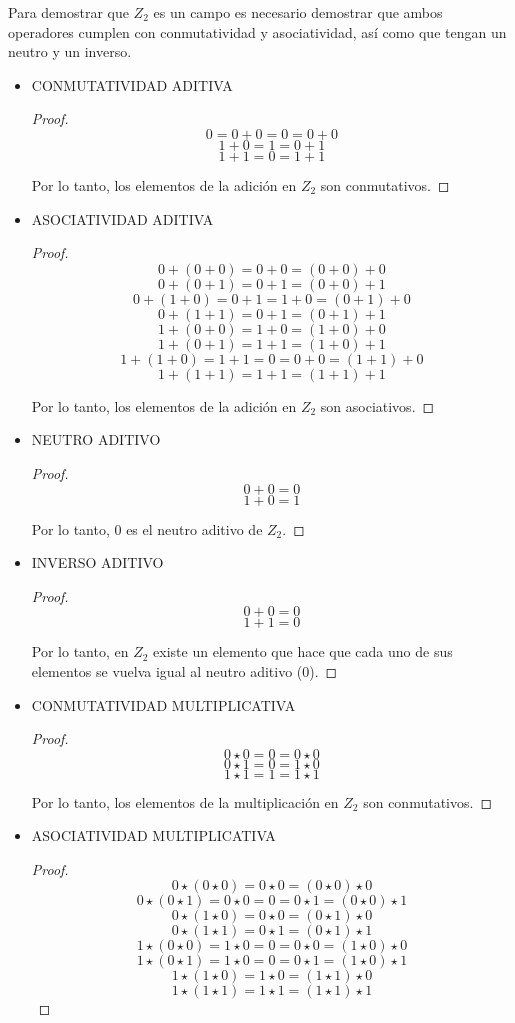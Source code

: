 \documentclass{article}
\begin{document}
Para demostrar que $Z_2$ es un campo es necesario demostrar que ambos operadores cumplen con conmutatividad y asociatividad, así como que tengan un neutro y un inverso.

\begin{itemize}
    \item CONMUTATIVIDAD ADITIVA
\begin{proof}
    $$
    0 = 0 + 0 = 0 = 0 + 0
    $$$$
    1 + 0 = 1 = 0 + 1
    $$$$
    1 + 1 = 0 = 1 + 1
    $$
    
    Por lo tanto, los elementos de la adición en $Z_2$ son conmutativos.
\end{proof}

    \item ASOCIATIVIDAD ADITIVA
\begin{proof}
$$
0+(0+0) = 0+0 = (0+0) + 0
$$$$
0+(0+1) = 0+1 = (0+0) + 1
$$$$
0+(1+0) = 0+1 = 1+0 = (0+1) + 0
$$$$
0+(1+1) = 0+1 = (0+1) + 1
$$$$
1+(0+0) = 1+0 = (1+0) + 0
$$$$
1+(0+1) = 1+1 = (1+0) + 1
$$$$
1+(1+0) = 1+1 = 0 = 0 + 0 = (1+1) + 0
$$$$
1+(1+1) = 1+1 = (1+1) + 1
$$

Por lo tanto, los elementos de la adición en $Z_2$ son asociativos.
\end{proof}

    \item NEUTRO ADITIVO
\begin{proof}
$$
0+0 = 0
$$$$
1+0 = 1
$$

Por lo tanto, $0$ es el neutro aditivo de $Z_2$.
\end{proof}

    \item INVERSO ADITIVO
\begin{proof}
$$
0 + 0 = 0
$$$$
1 + 1 = 0
$$

Por lo tanto, en $Z_2$ existe un elemento que hace que cada uno de sus elementos se vuelva igual al neutro aditivo ($0$).
\end{proof}
    \item CONMUTATIVIDAD MULTIPLICATIVA
\begin{proof}
$$
0 \star 0 = 0 = 0 \star 0
$$$$
0 \star 1 = 0 = 1 \star 0
$$$$
1 \star 1 = 1 = 1 \star 1
$$

Por lo tanto, los elementos de la multiplicación en $Z_2$ son conmutativos.
\end{proof}

\newpage
    \item ASOCIATIVIDAD MULTIPLICATIVA
\begin{proof}
$$
0 \star (0 \star 0) = 0 \star 0 = (0 \star 0) \star 0
$$$$
0 \star (0 \star 1) = 0 \star 0 = 0 = 0 \star 1 = (0 \star 0) \star 1
$$$$
0 \star (1 \star 0) = 0 \star 0 = (0 \star 1) \star 0
$$$$
0 \star (1 \star 1) = 0 \star 1 = (0 \star 1) \star 1
$$$$
1 \star (0 \star 0) = 1 \star 0 = 0 = 0 \star 0 = (1 \star 0) \star 0
$$$$
1 \star (0 \star 1) = 1 \star 0 = 0 = 0 \star 1 = (1 \star 0) \star 1
$$$$
1 \star (1 \star 0) = 1 \star 0 = (1 \star 1) \star 0
$$$$
1 \star (1 \star 1) = 1 \star 1 = (1 \star 1) \star 1
$$


\end{proof}
\end{itemize}
\end{document}
